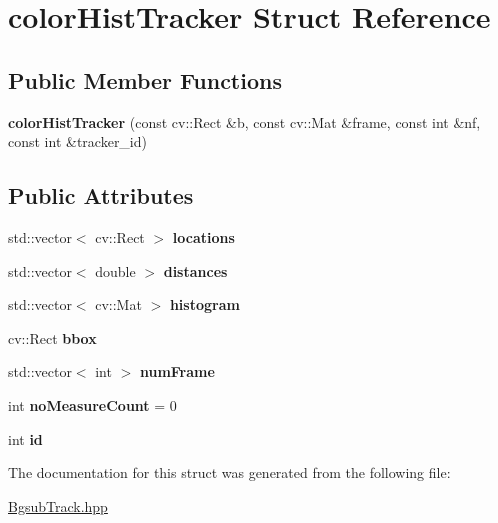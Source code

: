 \hypertarget{structcolorHistTracker}{}\section{color\+Hist\+Tracker Struct Reference}
\label{structcolorHistTracker}
\subsection*{Public Member Functions}
\begin{DoxyCompactItemize}
\item 
{\bfseries color\+Hist\+Tracker} (const cv\+::\+Rect \&b, const cv\+::\+Mat \&frame, const int \&nf, const int \&tracker\+\_\+id)\hypertarget{structcolorHistTracker_af0a30b3617d55686949d7cc3f066bdcc}{}\label{structcolorHistTracker_af0a30b3617d55686949d7cc3f066bdcc}

\end{DoxyCompactItemize}
\subsection*{Public Attributes}
\begin{DoxyCompactItemize}
\item 
std\+::vector$<$ cv\+::\+Rect $>$ {\bfseries locations}\hypertarget{structcolorHistTracker_ad866ba8b40aee19d969a9605dcfd7e44}{}\label{structcolorHistTracker_ad866ba8b40aee19d969a9605dcfd7e44}

\item 
std\+::vector$<$ double $>$ {\bfseries distances}\hypertarget{structcolorHistTracker_a81c58ded7defe0c901e2c340158632d0}{}\label{structcolorHistTracker_a81c58ded7defe0c901e2c340158632d0}

\item 
std\+::vector$<$ cv\+::\+Mat $>$ {\bfseries histogram}\hypertarget{structcolorHistTracker_a88aa596f02ac60189914712dc862e172}{}\label{structcolorHistTracker_a88aa596f02ac60189914712dc862e172}

\item 
cv\+::\+Rect {\bfseries bbox}\hypertarget{structcolorHistTracker_ab7beb1f934e8730a6f3409c19e836072}{}\label{structcolorHistTracker_ab7beb1f934e8730a6f3409c19e836072}

\item 
std\+::vector$<$ int $>$ {\bfseries num\+Frame}\hypertarget{structcolorHistTracker_ab027c6c566adf05f71339d52fec926a6}{}\label{structcolorHistTracker_ab027c6c566adf05f71339d52fec926a6}

\item 
int {\bfseries no\+Measure\+Count} = 0\hypertarget{structcolorHistTracker_a7edd3a48fe2c233e05d921e09b4831d6}{}\label{structcolorHistTracker_a7edd3a48fe2c233e05d921e09b4831d6}

\item 
int {\bfseries id}\hypertarget{structcolorHistTracker_a6881227892711bff410a091de27557fb}{}\label{structcolorHistTracker_a6881227892711bff410a091de27557fb}

\end{DoxyCompactItemize}


The documentation for this struct was generated from the following file\+:\begin{DoxyCompactItemize}
\item 
\hyperlink{BgsubTrack_8hpp}{Bgsub\+Track.\+hpp}\end{DoxyCompactItemize}
